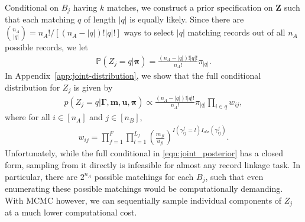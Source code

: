 \documentclass[12pt,letterpaper]{article}
\newcommand{\1}[1]{\mathbb{I}\!\left[#1\right]} %
\begin{document}
Conditional on $B_j$ having $k$ matches, we construct a prior specification on $\bm{Z}$ such that each matching $q$ of length $|q|$ is equally likely. Since there are ${n_A \choose |q|} = n_A!/ [(n_A - |q|)! |q|!]$ ways to select $|q|$ matching records out of all $n_A$ possible records, we let
\begin{align} \label{eqn:drl-prior}
	\mathbb{P}(Z_j = q| \bm{\pi}) = \frac{(n_A - |q|)! |q|!}{n_A!} \pi_{|q|}. 
\end{align}
In Appendix~\ref{app:joint-distribution}, we show that the full conditional distribution for $Z_j$ is given by
\begin{align} \label{eqn:joint_posterior}
		p\left(Z_j  = q|\bm{\Gamma}, \bm{m}, \bm{u}, \bm{\pi} \right) \propto \frac{(n_A - |q|)!|q|!}{n_A!} \pi_{|q|} \prod_{i \in q} w_{ij}, 
\end{align}
where for all $i \in [n_A]$ and $j \in [n_B]$, 
\begin{align*}
	w_{ij} = \prod_{f=1}^{F}\prod_{l = 1}^{L_f} \left(\frac{m_{fl}}{u_{fl}}\right)^{I(\gamma_{ij}^f = l)I_{obs}(\gamma_{ij}^f)} .
\end{align*}
Unfortunately, while the full conditional in \eqref{eqn:joint_posterior} has a closed form, sampling from it directly is infeasible for almost any record linkage task. In particular, there are $2^{n_A}$ possible matchings for each $B_j$, such that even enumerating these possible matchings would be computationally demanding. With MCMC however, we can sequentially sample individual components of $Z_j$ at a much lower computational cost.

\end{document}
